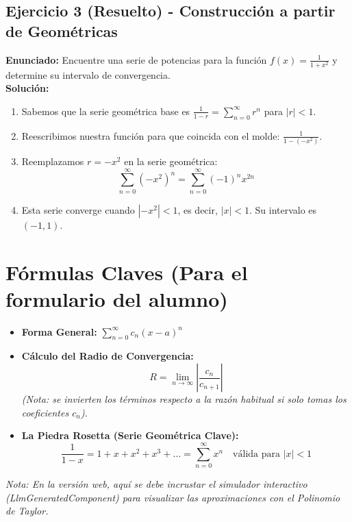 \documentclass[11pt, a4paper]{article}
\begin{document}
\subsection*{Ejercicio 3 (Resuelto) - Construcción a partir de Geométricas}
\textbf{Enunciado:} Encuentre una serie de potencias para la función $f(x) = \frac{1}{1+x^2}$ y determine su intervalo de convergencia.\\
\textbf{Solución:}
\begin{enumerate}
    \item Sabemos que la serie geométrica base es $\frac{1}{1-r} = \sum_{n=0}^{\infty} r^n$ para $|r| < 1$.
    \item Reescribimos nuestra función para que coincida con el molde: $\frac{1}{1 - (-x^2)}$.
    \item Reemplazamos $r = -x^2$ en la serie geométrica:
    \[ \sum_{n=0}^{\infty} (-x^2)^n = \sum_{n=0}^{\infty} (-1)^n x^{2n} \]
    \item Esta serie converge cuando $|-x^2| < 1$, es decir, $|x| < 1$. Su intervalo es $(-1, 1)$.
\end{enumerate}

\section{Fórmulas Claves (Para el formulario del alumno)}
\begin{itemize}
    \item \textbf{Forma General:} $\sum_{n=0}^{\infty} c_n (x-a)^n$
    \item \textbf{Cálculo del Radio de Convergencia:}
    \[ R = \lim_{n \to \infty} \left| \frac{c_n}{c_{n+1}} \right| \]
    \textit{(Nota: se invierten los términos respecto a la razón habitual si solo tomas los coeficientes $c_n$).}
    \item \textbf{La Piedra Rosetta (Serie Geométrica Clave):}
    \[ \frac{1}{1-x} = 1 + x + x^2 + x^3 + \dots = \sum_{n=0}^{\infty} x^n \quad \text{válida para } |x| < 1 \]
\end{itemize}

\vfill
\begin{center}
    \textit{Nota: En la versión web, aquí se debe incrustar el simulador interactivo (LlmGeneratedComponent) para visualizar las aproximaciones con el Polinomio de Taylor.}
\end{center}
\end{document}
